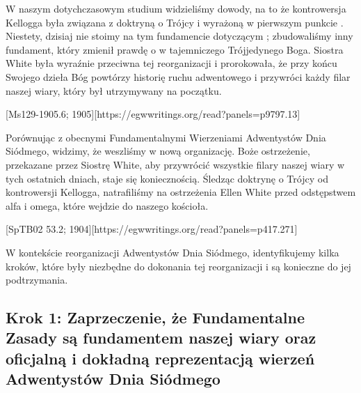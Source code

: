 
W naszym dotychczasowym studium widzieliśmy dowody, na to że kontrowersja Kellogga była związana z doktryną o Trójcy i  wyrażoną w pierwszym punkcie . Niestety, dzisiaj nie stoimy na tym fundamencie dotyczącym ; zbudowaliśmy inny fundament, który zmienił prawdę o  w tajemniczego Trójjedynego Boga. Siostra White była wyraźnie przeciwna tej reorganizacji i prorokowała, że przy końcu Swojego dzieła Bóg powtórzy historię ruchu adwentowego i przywróci każdy filar naszej wiary, który był utrzymywany na początku.

[Ms129-1905.6; 1905][https://egwwritings.org/read?panels=p9797.13]

Porównując  z obecnymi Fundamentalnymi Wierzeniami Adwentystów Dnia Siódmego, widzimy, że weszliśmy w nową organizację. Boże ostrzeżenie, przekazane przez Siostrę White, aby przywrócić wszystkie filary naszej wiary w tych ostatnich dniach, staje się koniecznością. Śledząc doktrynę o Trójcy od kontrowersji Kellogga, natrafiliśmy na ostrzeżenia Ellen White przed odstępstwem alfa i omega, które wejdzie do naszego kościoła.

[SpTB02 53.2; 1904][https://egwwritings.org/read?panels=p417.271]

W kontekście reorganizacji Adwentystów Dnia Siódmego, identyfikujemy kilka kroków, które były niezbędne do dokonania tej reorganizacji i są konieczne do jej podtrzymania.

\subsection*{Krok 1: Zaprzeczenie, że Fundamentalne Zasady są fundamentem naszej wiary oraz oficjalną i dokładną reprezentacją wierzeń Adwentystów Dnia Siódmego}

